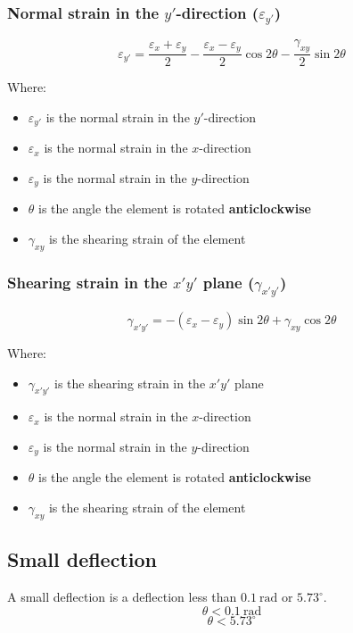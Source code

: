 \documentclass[11pt]{article}
\begin{document}
\subsubsection{Normal strain in the \(y'\)-direction (\(\varepsilon_{y'}\))}
\label{sec:org5731cdc}
\[\varepsilon_{y'} = \frac{\varepsilon_x + \varepsilon_y}{2} - \frac{\varepsilon_x - \varepsilon_y}{2} \cos 2 \theta - \frac{\gamma_{xy}}{2} \sin 2 \theta\]

Where:
\begin{itemize}
\item \(\varepsilon_{y'}\) is the normal strain in the \(y'\)-direction
\item \(\varepsilon_{x}\) is the normal strain in the \(x\)-direction
\item \(\varepsilon_{y}\) is the normal strain in the \(y\)-direction
\item \(\theta\) is the angle the element is rotated \textbf{anticlockwise}
\item \(\gamma_{xy}\) is the shearing strain of the element
\end{itemize}

\subsubsection{Shearing strain in the \(x'y'\) plane (\(\gamma_{x'y'}\))}
\label{sec:org5c37070}
\[\gamma_{x'y'} = - (\varepsilon_x - \varepsilon_y) \sin 2 \theta + \gamma_{xy} \cos 2 \theta\]

Where:
\begin{itemize}
\item \(\gamma_{x'y'}\) is the shearing strain in the \(x'y'\) plane
\item \(\varepsilon_{x}\) is the normal strain in the \(x\)-direction
\item \(\varepsilon_{y}\) is the normal strain in the \(y\)-direction
\item \(\theta\) is the angle the element is rotated \textbf{anticlockwise}
\item \(\gamma_{xy}\) is the shearing strain of the element
\end{itemize}

\subsection{Small deflection}
\label{sec:org78d8f41}
A small deflection is a deflection less than \(\qty{0.1}{\radian}\) or \(5.73^{\circ}\).
\[\theta < \qty{0.1}{\radian}\]
\[\theta < 5.73^{\circ}\]
\end{document}
